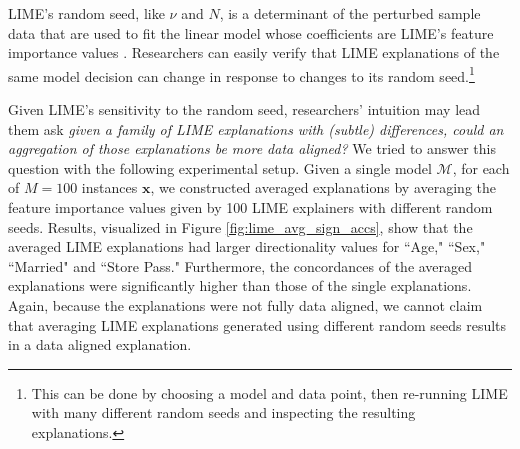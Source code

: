 \documentclass[mnsc,blindrev]{informs3}
\begin{document}
            LIME's random seed, like $\nu$ and $N$, is a determinant of the perturbed sample data that are used to fit the linear model whose coefficients are LIME's feature importance values \citep{alvarez18robustness}. Researchers can easily verify that LIME explanations of the same model decision can change in response to changes to its random seed.\footnote{This can be done by choosing a model and data point, then re-running LIME with many different random seeds and inspecting the resulting explanations.} 
            
            Given LIME's sensitivity to the random seed, researchers' intuition may lead them ask \emph{given a family of LIME explanations with (subtle) differences, could an aggregation of those explanations be more data aligned?} We tried to answer this question with the following experimental setup. Given a single model $\mathcal{M}$, for each of $M=100$ instances $\mathbf{x}$, we constructed averaged explanations by averaging the feature importance values given by 100 LIME explainers with different random seeds.
            Results, visualized in Figure \ref{fig:lime_avg_sign_accs}, show that the averaged LIME explanations had larger directionality values for ``Age," ``Sex," ``Married" and ``Store Pass." %
            Furthermore, the concordances of the averaged explanations were significantly higher than those of the single explanations. Again, because the explanations were not fully data aligned, we cannot claim that averaging LIME explanations generated using different random seeds results in a data aligned explanation.%
\end{document}
